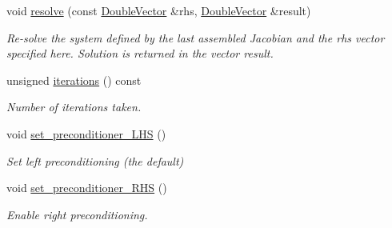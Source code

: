 \begin{DoxyCompactItemize}
void \hyperlink{classoomph_1_1HelmholtzGMRESMG_ad6937ea7f72719eb9e33c28c002fa380}{resolve} (const \hyperlink{classoomph_1_1DoubleVector}{Double\+Vector} \&rhs, \hyperlink{classoomph_1_1DoubleVector}{Double\+Vector} \&result)
\begin{DoxyCompactList}\small\item\em Re-\/solve the system defined by the last assembled Jacobian and the rhs vector specified here. Solution is returned in the vector result. \end{DoxyCompactList}\item 
unsigned \hyperlink{classoomph_1_1HelmholtzGMRESMG_ad2ae5c641eae7da8c7556b646fe38d36}{iterations} () const
\begin{DoxyCompactList}\small\item\em Number of iterations taken. \end{DoxyCompactList}\item 
void \hyperlink{classoomph_1_1HelmholtzGMRESMG_a86f6bd77359a37117aeb17798b886a81}{set\+\_\+preconditioner\+\_\+\+L\+HS} ()
\begin{DoxyCompactList}\small\item\em Set left preconditioning (the default) \end{DoxyCompactList}\item 
void \hyperlink{classoomph_1_1HelmholtzGMRESMG_ab10551b0e67b40ad91555b1e612208a2}{set\+\_\+preconditioner\+\_\+\+R\+HS} ()
\begin{DoxyCompactList}\small\item\em Enable right preconditioning. \end{DoxyCompactList}\end{DoxyCompactItemize}
